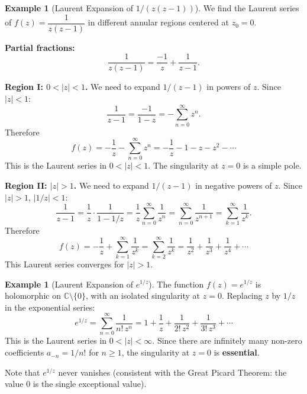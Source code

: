 \documentclass[12pt,a4paper,openany]{book}
\theoremstyle{definition}
\newtheorem{example}[definition]{Example}
\theoremstyle{plain}
\theoremstyle{remark}
\newcommand{\C}{\mathbb{C}}
\newcommand{\abs}[1]{\left|#1\right|}
\begin{document}
\begin{example}[Laurent Expansion of $1/(z(z-1))$]\label{ex:laurent-1}
We find the Laurent series of $f(z)=\dfrac{1}{z(z-1)}$ in different annular regions
centered at $z_0=0$.

\medskip\noindent
\textbf{Partial fractions:}
\[
  \frac{1}{z(z-1)} = \frac{-1}{z} + \frac{1}{z-1}.
\]

\medskip\noindent
\textbf{Region I: $0<\abs{z}<1$.}
We need to expand $1/(z-1)$ in powers of $z$. Since $\abs{z}<1$:
\[
  \frac{1}{z-1} = \frac{-1}{1-z} = -\sum_{n=0}^{\infty}z^n.
\]
Therefore
\[
  f(z) = -\frac{1}{z} - \sum_{n=0}^{\infty}z^n
  = -\frac{1}{z} - 1 - z - z^2 - \cdots
\]
This is the Laurent series in $0<\abs{z}<1$. The singularity at $z=0$ is a
simple pole.

\begin{center}
\end{center}

\medskip\noindent
\textbf{Region II: $\abs{z}>1$.}
We need to expand $1/(z-1)$ in negative powers of $z$. Since $\abs{z}>1$,
$\abs{1/z}<1$:
\[
  \frac{1}{z-1} = \frac{1}{z}\cdot\frac{1}{1-1/z}
  = \frac{1}{z}\sum_{n=0}^{\infty}\frac{1}{z^n}
  = \sum_{n=0}^{\infty}\frac{1}{z^{n+1}}
  = \sum_{k=1}^{\infty}\frac{1}{z^k}.
\]
Therefore
\[
  f(z) = -\frac{1}{z} + \sum_{k=1}^{\infty}\frac{1}{z^k}
  = \sum_{k=2}^{\infty}\frac{1}{z^k}
  = \frac{1}{z^2}+\frac{1}{z^3}+\frac{1}{z^4}+\cdots
\]
This Laurent series converges for $\abs{z}>1$.
\end{example}

\begin{example}[Laurent Expansion of $e^{1/z}$]\label{ex:laurent-exp}
The function $f(z)=e^{1/z}$ is holomorphic on $\C\setminus\{0\}$, with an
isolated singularity at $z=0$. Replacing $z$ by $1/z$ in the exponential series:
\[
  e^{1/z} = \sum_{n=0}^{\infty}\frac{1}{n!\,z^n}
  = 1 + \frac{1}{z} + \frac{1}{2!\,z^2} + \frac{1}{3!\,z^3} + \cdots
\]
This is the Laurent series in $0<\abs{z}<\infty$. Since there are infinitely many
non-zero coefficients $a_{-n}=1/n!$ for $n\ge 1$, the singularity at $z=0$ is
\textbf{essential}.

Note that $e^{1/z}$ never vanishes (consistent with the Great Picard Theorem: the
value $0$ is the single exceptional value).
\end{example}
\end{document}
